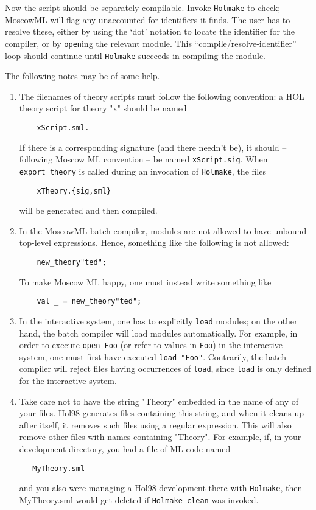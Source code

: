 \documentclass[12pt,fleqn,layout,a4paper]{report}
\begin{document}
Now the script should be separately compilable. Invoke {\tt Holmake} to check;
MoscowML will flag any unaccounted-for identifiers it finds. The user
has to resolve these, either by using the `dot' notation to locate the
identifier for the compiler, or by \verb+open+ing the relevant
module. This ``compile/resolve-identifier'' loop should continue until
{\tt Holmake} succeeds in compiling the module.

The following notes may be of some help.

\begin{enumerate}
\item The filenames of theory scripts must follow the following
convention: a HOL theory script for theory "x" should be
named
\begin{verbatim}
    xScript.sml.
\end{verbatim}
If there is a corresponding signature (and there needn't be), it
should -- following Moscow ML convention -- be named \verb+xScript.sig+. When
\verb+export_theory+ is called during an invocation of \verb+Holmake+,
the files
\begin{verbatim}
    xTheory.{sig,sml}
\end{verbatim}
will be generated and then compiled.

\item In the MoscowML batch compiler, modules are not allowed to have unbound
top-level expressions. Hence, something like the following is not
allowed:
\begin{verbatim}
    new_theory"ted";
\end{verbatim}
To make Moscow ML happy, one must instead write something like
\begin{verbatim}
    val _ = new_theory"ted";
\end{verbatim}


\item In the interactive system, one has to explicitly \verb+load+
modules; on the other hand, the batch compiler will load modules
automatically.  For example, in order to execute \verb+open Foo+ (or
refer to values in \verb+Foo+) in the interactive system, one must first
have executed \verb+load "Foo"+. Contrarily, the batch compiler will reject
files having occurrences of \verb+load+, since \verb+load+ is only
defined for the interactive system.

\item Take care not to have the string "Theory" embedded in the name of any of
your files. Hol98 generates files containing this string, and when it
cleans up after itself, it removes such files using a regular
expression. This will also remove other files with names containing
"Theory". For example, if, in your development directory, you had a file
of ML code named
\begin{verbatim}
   MyTheory.sml
\end{verbatim}
and you also were managing a Hol98 development there with {\tt Holmake}, then
MyTheory.sml would get deleted if \verb+Holmake clean+ was invoked.



\end{enumerate}
\end{document}
